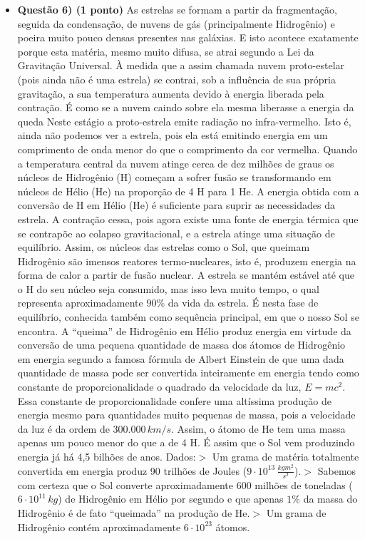 \documentclass[a4paper, 12pt]{article}
\begin{document}
\begin{flushleft}
\begin{itemize}
        \item \textbf{Questão 6) (1 ponto)} As estrelas se formam a partir da fragmentação, seguida da condensação, de nuvens de gás (principalmente Hidrogênio) e poeira muito pouco densas presentes nas galáxias. E isto acontece exatamente porque esta matéria, mesmo muito difusa, se atrai segundo a Lei da Gravitação Universal. À medida que a assim chamada nuvem proto-estelar (pois ainda não é uma estrela) se contrai, sob a influência de sua própria gravitação, a sua temperatura aumenta devido à energia liberada pela contração. É como se a nuvem caindo sobre ela mesma liberasse a energia da queda Neste estágio a proto-estrela emite radiação no infra-vermelho. Isto é, ainda não podemos ver a estrela, pois ela está emitindo energia em um comprimento de onda menor do que o comprimento da cor vermelha. Quando a temperatura central da nuvem atinge cerca de dez milhões de graus os núcleos de Hidrogênio (H) começam a sofrer fusão se transformando em núcleos de Hélio (He) na proporção de 4 H para 1 He. A energia obtida com a conversão de H em Hélio (He) é suficiente para suprir as necessidades da estrela. A contração cessa, pois agora existe uma fonte de energia térmica que se contrapõe ao colapso gravitacional, e a estrela atinge uma situação de equilíbrio. Assim, os núcleos das estrelas como o Sol, que queimam Hidrogênio são imensos reatores termo-nucleares, isto é, produzem energia na forma de calor a partir de fusão nuclear. A estrela se mantém estável até que o H do seu núcleo seja consumido, mas isso leva muito tempo, o qual representa aproximadamente $90\%$ da vida da estrela. É nesta fase de equilíbrio, conhecida também como sequência principal, em que o nosso Sol se encontra. A “queima” de Hidrogênio em Hélio produz energia em virtude da conversão de uma pequena quantidade de massa dos átomos de Hidrogênio em energia segundo a famosa fórmula de Albert Einstein de que uma dada quantidade de massa pode ser convertida inteiramente em energia tendo como constante de proporcionalidade o quadrado da velocidade da luz, $E = mc^2$. Essa constante de proporcionalidade confere uma altíssima produção de energia mesmo para quantidades muito pequenas de massa, pois a velocidade da luz é da ordem de $300.000 \, km/s$. Assim, o átomo de He tem uma massa apenas um pouco menor do que a de 4 H. É assim que o Sol vem produzindo energia já há 4,5 bilhões de anos. \linebreak \linebreak Dados:\linebreak$>$ Um grama de matéria totalmente convertida em energia produz 90 trilhões de Joules ($9 \cdot 10^{13} \, \frac{kgm^2}{s^2}$).\linebreak$>$ Sabemos com certeza que o Sol converte aproximadamente 600 milhões de toneladas ($6 \cdot 10^{11} \, kg$) de Hidrogênio em Hélio por segundo e que apenas $1\%$ da massa do Hidrogênio é de fato “queimada” na produção de He.\linebreak$>$ Um grama de Hidrogênio contém aproximadamente $6 \cdot 10^{23}$ átomos.

\end{itemize}
\end{flushleft}
\end{document}
